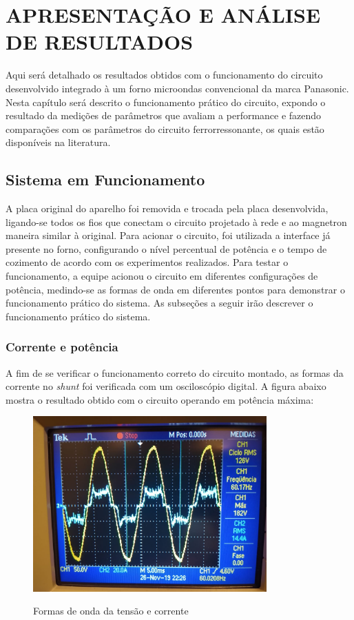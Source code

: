 
\chapter{APRESENTAÇÃO E ANÁLISE DE RESULTADOS}

Aqui será detalhado os resultados obtidos com o funcionamento do circuito desenvolvido integrado à um forno microondas convencional da marca Panasonic. Nesta capítulo será descrito o funcionamento prático do circuito, expondo o resultado da medições de parâmetros que avaliam a performance e fazendo comparações com os parâmetros do circuito ferrorressonante, os quais estão disponíveis na literatura. 


\section{Sistema em Funcionamento}
A placa original do aparelho foi removida e trocada pela placa desenvolvida, ligando-se todos os fios que conectam o circuito projetado à rede e ao magnetron maneira similar à original. Para acionar o circuito, foi utilizada a interface já presente no forno, configurando o nível percentual de potência e o tempo de cozimento de acordo com os experimentos realizados. Para testar o funcionamento, a equipe acionou o circuito em diferentes configurações de potência, medindo-se as formas de onda em diferentes pontos para demonstrar o funcionamento prático do sistema. As subseções a seguir irão descrever o funcionamento prático do sistema.

\subsection{Corrente e potência}
A fim de se verificar o funcionamento correto do circuito montado, as formas da corrente no \textit{shunt} foi verificada com um osciloscópio digital. A figura abaixo mostra o resultado obtido com o circuito operando em potência máxima:

\begin{figure}[H]
    \centering
    \caption{Formas de onda da tensão e corrente}
    \includegraphics[width=0.8\textwidth]{./dados/figuras/onda_corrente}
    \label{fig:figura-onda_corrente}
\end{figure}

